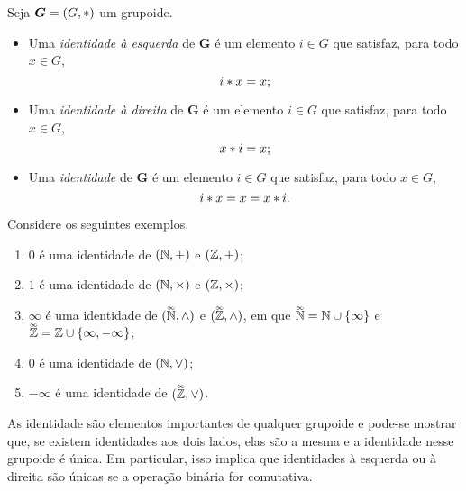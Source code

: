 \begin{definition}[Identidade]
Seja $\bm G=(G,\ast)$ um grupoide.
	\begin{itemize}
	\item Uma \emph{identidade à esquerda} de $\bm G$ é um elemento $i \in G$ que satisfaz, para todo $x \in G$,
		\begin{equation*}
		i \ast x = x;
		\end{equation*}
	\item Uma \emph{identidade à direita} de $\bm G$ é um elemento $i \in G$ que satisfaz, para todo $x \in G$,
		\begin{equation*}
		x \ast i = x;
		\end{equation*}
	\item Uma \emph{identidade} de $\bm G$ é um elemento $i \in G$ que satisfaz, para todo $x \in G$,
		\begin{equation*}
		i \ast x = x = x \ast i.
		\end{equation*}
	\end{itemize}
\end{definition}

\begin{example}
Considere os seguintes exemplos.
	\begin{enumerate}
	\item $0$ é uma identidade de $(\mathbb{N},+)$ e $(\mathbb{Z},+)$;
	\item $1$ é uma identidade de $(\mathbb{N},\times)$ e $(\mathbb{Z},\times)$;
	\item $\infty$ é uma identidade de $(\accentset{\infty}{\mathbb{N}},\mathbin{\wedge})$ e $(\accentset{\infty}{\mathbb{Z}},\mathbin{\wedge})$, em que $\accentset{\infty}{\mathbb{N}} = \mathbb{N} \cup \{\infty\}$ e $\accentset{\infty}{\mathbb{Z}} = \mathbb{Z} \cup \{\infty,-\infty\}$;
	\item $0$ é uma identidade de $(\mathbb{N},\mathbin{\vee})$;
	\item $-\infty$ é uma identidade de $(\accentset{\infty}{\mathbb{Z}},\mathbin{\vee})$.
	\end{enumerate}
\end{example}

As identidade são elementos importantes de qualquer grupoide e pode-se mostrar que, se existem identidades aos dois lados, elas são a mesma e a identidade nesse grupoide é única. Em particular, isso implica que identidades à esquerda ou à direita são únicas se a operação binária for comutativa.

\begin{comment}
\begin{proposition}
\label{prop:unic.elem.neut}
Seja $\bm G = (G,\opb)$ um grupoide. Se $\id$ é uma identidade à esquerda e $\id'$ é uma identidade à direita de $\bm G$, então $\id = \id'$ e $\id$ é a única identidade de $\bm G$.
\end{proposition}
\begin{proof}
Como $\id'$ é identidade à direita e $\id$ é identidade à esquerda de $\bm G$, segue que
	\begin{equation*}
	\id = \id \opb \id' = \id'.
	\end{equation*}
A unicidade segue pois qualquer identidade de $\bm G$ é identidade à esquerda.
\end{proof}
\end{comment}

